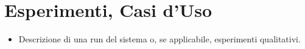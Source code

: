 \chapter{Esperimenti, Casi d’Uso}

\begin{itemize}
  \item Descrizione di una run del sistema o, se applicabile, esperimenti qualitativi.
\end{itemize}